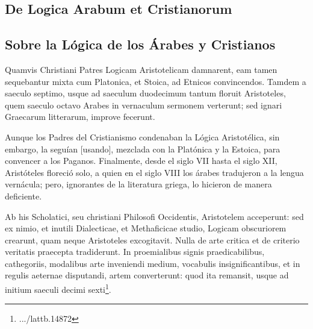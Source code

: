 \message{ !name(tractatus.tex)}\documentclass{article}
\begin{document}
\begin{paracol}{2}
\begin{nthcolumn}{1}
\end{nthcolumn}
\vspace{0.5cm}
\begin{nthcolumn*}{0} %
  \subsection*{\centering De Logica Arabum et Cristianorum}
\end{nthcolumn*}
\vspace{0.5cm}
\begin{nthcolumn}{1} %
  \subsection*{\centering Sobre la Lógica de los Árabes y Cristianos}
\end{nthcolumn}
\vspace{0.5cm}
\begin{nthcolumn*}{0} %
  Quamvis Christiani Patres Logicam Aristotelicam damnarent, eam tamen sequebantur mixta cum Platonica, et Stoica, ad Etnicos convincendos. Tamdem a saeculo septimo, usque ad saeculum duodecimum tantum floruit Aristoteles, quem saeculo octavo Arabes in vernaculum sermonem verterunt; sed ignari Graecarum litterarum, improve fecerunt.
\end{nthcolumn*}
\vspace{0.5cm}
\begin{nthcolumn}{1} %
  Aunque los Padres del Cristianismo condenaban la Lógica Aristotélica, sin embargo, la seguían [usando], mezclada con la Platónica y la Estoica, para convencer a los Paganos. Finalmente, desde el siglo VII hasta el siglo XII, Aristóteles floreció solo, a quien en el siglo VIII los árabes tradujeron a la lengua vernácula; pero, ignorantes de la literatura griega, lo hicieron de manera deficiente.
\end{nthcolumn}
\vspace{0.5cm}
\begin{nthcolumn*}{0} %
  Ab his Scholatici, seu christiani Philosofi Occidentis, Aristotelem acceperunt: sed ex nimio, et inutili Dialecticae, et Methaficicae studio, Logicam obscuriorem crearunt, quam neque Aristoteles excogitavit. Nulla de arte critica et de criterio veritatis praecepta tradiderunt. In proemialibus signis praedicabilibus, cathegoriis, modalibus arte inveniendi medium, vocabulis insignificantibus, et in regulis aeternae disputandi, artem converterunt: quod ita remansit, usque ad initium saeculi decimi sexti\footnote{.../lattb.14872}.

\end{nthcolumn*}
\end{paracol}
\end{document}
